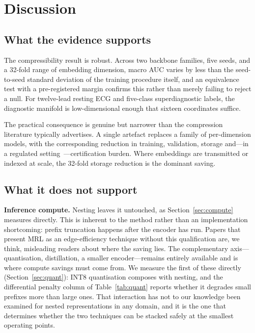 \section{Discussion}

\subsection{What the evidence supports}

The compressibility result is robust. Across two backbone families, five
seeds, and a 32-fold range of embedding dimension, macro AUC varies by less
than the seed-to-seed standard deviation of the training procedure itself, and
an equivalence test with a pre-registered margin confirms this rather than
merely failing to reject a null. For twelve-lead resting ECG and five-class
superdiagnostic labels, the diagnostic manifold is low-dimensional enough that
sixteen coordinates suffice.

The practical consequence is genuine but narrower than the compression
literature typically advertises. A single artefact replaces a family of
per-dimension models, with the corresponding reduction in training,
validation, storage and---in a regulated setting~\cite{fda2021}---certification
burden. Where embeddings are transmitted or indexed at scale, the 32-fold
storage reduction is the dominant saving.

\subsection{What it does not support}

\textbf{Inference compute.} Nesting leaves it untouched, as
Section~\ref{sec:compute} measures directly. This is inherent to the method
rather than an implementation shortcoming: prefix truncation happens after the
encoder has run. Papers that present MRL as an edge-efficiency technique
without this qualification are, we think, misleading readers about where the
saving lies. The complementary axis---quantisation, distillation, a smaller
encoder---remains entirely available and is where compute savings must come
from. We measure the first of these directly (Section~\ref{sec:quant}): INT8
quantisation composes with nesting, and the differential penalty column of
Table~\ref{tab:quant} reports whether it degrades small prefixes more than
large ones. That interaction has not to our knowledge been examined for nested
representations in any domain, and it is the one that determines whether the
two techniques can be stacked safely at the smallest operating points.

